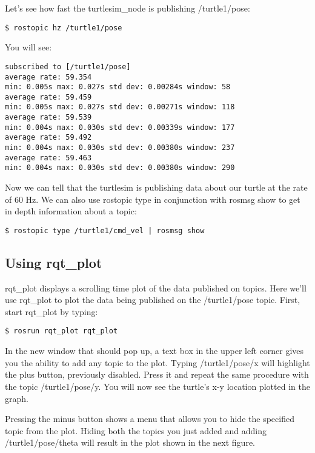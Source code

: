 Let's see how fast the turtlesim\_node is publishing /turtle1/pose:
\begin{lstlisting}[breaklines=true languages=bash]
$ rostopic hz /turtle1/pose
\end{lstlisting}

You will see:
\begin{lstlisting}[breaklines=true languages=bash]
subscribed to [/turtle1/pose]
average rate: 59.354
min: 0.005s max: 0.027s std dev: 0.00284s window: 58
average rate: 59.459
min: 0.005s max: 0.027s std dev: 0.00271s window: 118
average rate: 59.539
min: 0.004s max: 0.030s std dev: 0.00339s window: 177
average rate: 59.492
min: 0.004s max: 0.030s std dev: 0.00380s window: 237
average rate: 59.463
min: 0.004s max: 0.030s std dev: 0.00380s window: 290
\end{lstlisting}

Now we can tell that the turtlesim is publishing data about our turtle at the rate of 60 Hz. We can also use rostopic type in conjunction with rosmsg show to get in depth information about a topic:

\begin{lstlisting}[breaklines=true languages=bash]
$ rostopic type /turtle1/cmd_vel | rosmsg show
\end{lstlisting}

\subsection{Using rqt\_plot}

rqt\_plot displays a scrolling time plot of the data published on topics. Here we'll use rqt\_plot to plot the data being published on the /turtle1/pose topic. First, start rqt\_plot by typing:

\begin{lstlisting}[breaklines=true languages=bash]
$ rosrun rqt_plot rqt_plot
\end{lstlisting}
In the new window that should pop up, a text box in the upper left corner gives you the ability to add any topic to the plot. Typing /turtle1/pose/x will highlight the plus button, previously disabled. Press it and repeat the same procedure with the topic /turtle1/pose/y. You will now see the turtle's x-y location plotted in the graph.

Pressing the minus button shows a menu that allows you to hide the specified topic from the plot. Hiding both the topics you just added and adding /turtle1/pose/theta will result in the plot shown in the next figure.

